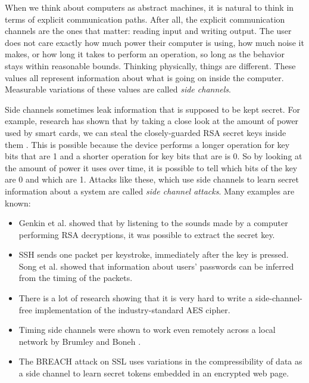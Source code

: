 \documentclass{acm_proc_article-sp}
\begin{document}
When we think about computers as abstract machines, it is natural to think in
terms of explicit communication paths. After all, the explicit communication
channels are the ones that matter: reading input and writing output. The user
does not care exactly how much power their computer is using, how much noise it
makes, or how long it takes to perform an operation, so long as the behavior
stays within reasonable bounds. Thinking physically, things are different. These
values all represent information about what is going on inside the computer.
Measurable variations of these values are called \emph{side channels}.

Side channels sometimes leak information that is supposed to be kept secret. For
example, research has shown that by taking a close look at the amount of power
used by smart cards, we can steal the closely-guarded RSA secret keys inside
them \cite{messerges1999power}. This is possible because the device performs
a longer operation for key bits that are 1 and a shorter operation for key bits
that are is 0. So by looking at the amount of power it uses over time, it is
possible to tell which bits of the key are 0 and which are 1. Attacks like
these, which use side channels to learn secret information about a system are
called \emph{side channel attacks}. Many examples are known:

\begin{itemize}
\item Genkin et al. \cite{genkin2013rsa} showed that by listening to the sounds
made by a computer performing RSA decryptions, it was possible to extract the
secret key.

\item SSH sends one packet per keystroke, immediately after the key is pressed.
Song et al. \cite{song2001timing} showed that information about users' passwords
can be inferred from the timing of the packets.

\item There is a lot of research \cite{aciiccmez2006cache, bernstein2005cache,
    osvik2006cache, weiss2012cache} showing that it is very hard to write
    a side-channel-free implementation of the industry-standard AES cipher.

\item Timing side channels were shown to work even remotely across a local
network by Brumley and Boneh \cite{brumley2005remote}.

\item The BREACH attack on SSL \cite{gluck2013breach} uses variations in the
    compressibility of data as a side channel to learn secret tokens embedded in
    an encrypted web page.
\end{itemize}
\end{document}
